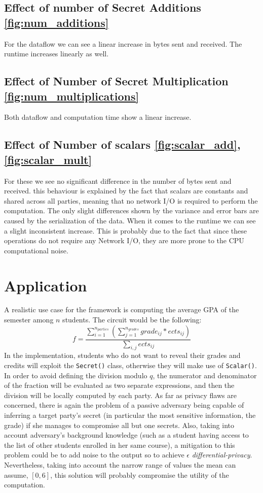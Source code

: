 \documentclass[10pt,conference,compsocconf]{IEEEtran}
\begin{document}
\subsection{Effect of number of Secret Additions \ref{fig:num_additions}}

For the dataflow we can see a linear increase in bytes sent and received.
The runtime increases linearly as well.

\subsection{Effect of Number of Secret Multiplication \ref{fig:num_multiplications}}
Both dataflow and computation time show a linear increase.

\subsection{Effect of Number of scalars \ref{fig:scalar_add},\ref{fig:scalar_mult}}
For these we see no significant difference in the number of bytes sent and received.
this behaviour is explained by the fact that scalars are constants and shared across all parties, meaning that no network
I/O is required to perform the computation.
The only slight differences shown by the variance and error bars are caused by the serialization of the data.
When it comes to the runtime we can see a slight inconsistent increase.
This is probably due to the fact that since these operations do not require any Network I/O, they are more
prone to the CPU computational noise.

\section{Application}
A realistic use case for the framework is computing the average GPA of the semester among $n$ students. The circuit would be the following:
\[f = \frac{\sum_{i=1}^{n_{parties}}(\sum_{j=1}^{n_{grades}}grade_{ij}*ects_{ij})}{\sum_{i,j}ects_{ij}}\]
In the implementation, students who do not want to reveal their grades and credits will exploit the \texttt{Secret()} class, otherwise they will make use of \texttt{Scalar()}.
In order to avoid defining the division modulo $q$, the numerator and denominator of the fraction will be evaluated as two separate expressions, and then the division will be locally computed by each party.
As far as privacy flaws are concerned, there is again the problem of a passive adversary being capable of inferring a target party's secret (in particular the most sensitive information, the grade) if she manages to compromise all but one secrets.
Also, taking into account adversary's background knowledge (such as a student having access to the list of other students enrolled in her same course), a mitigation to this problem could be to add noise to the output so to achieve $\epsilon$ \textit{differential-privacy}. Nevertheless, taking into account the narrow range of values the mean can assume, $[0,6]$, this solution will probably compromise the utility of the computation.  


\end{document}
